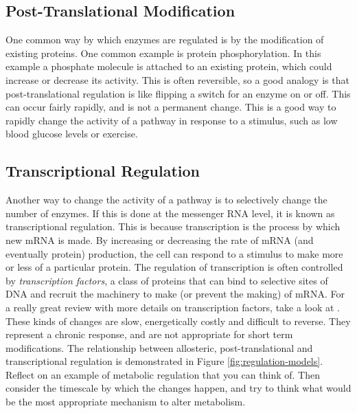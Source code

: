 \documentclass{tufte-handout}
\begin{document}
\subsection{Post-Translational Modification}

One common way by which enzymes are regulated is by the modification of existing proteins.  One common example is protein phosphorylation.  In this example a phosphate molecule is attached to an existing protein, which could increase or decrease its activity.  This is often reversible, so a good analogy is that post-translational regulation is like flipping a switch for an enzyme on or off.  This can occur fairly rapidly, and is not a permanent change.  This is a good way to rapidly change the activity of a pathway in response to a stimulus, such as low blood glucose levels or exercise.

\subsection{Transcriptional Regulation}

Another way to change the activity of a pathway is to selectively change the number of enzymes.  If this is done at the messenger RNA level, it is known as transcriptional regulation.  This is because transcription is the process by which new mRNA is made.  By increasing or decreasing the rate of mRNA (and eventually protein) production, the cell can respond to a stimulus to make more or less of a particular protein.  The regulation of transcription is often controlled by \emph{transcription factors}, a class of proteins that can bind to selective sites of DNA and recruit the machinery to make (or prevent the making) of mRNA.  For a really great review with more details on transcription factors, take a look at \citet{Lambert2018}.  These kinds of changes are slow, energetically costly and difficult to reverse.  They represent a chronic response, and are not appropriate for short term modifications.  The relationship between allosteric, post-translational and transcriptional regulation is demonstrated in Figure \ref{fig:regulation-models}.  Reflect on an example of metabolic regulation that you can think of.  Then consider the timescale by which the changes happen, and try to think what would be the most appropriate mechanism to alter metabolism.
\end{document}
